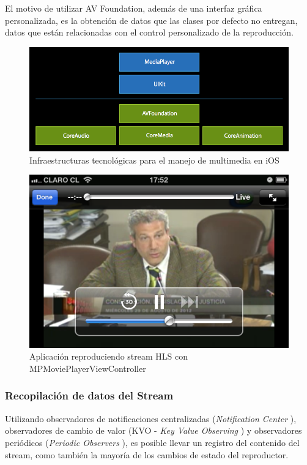 El motivo de utilizar AV Foundation, además de una interfaz gráfica personalizada, es la obtención de datos que las clases por defecto no entregan, datos que están relacionadas con el control personalizado de la reproducción.


\begin{figure}[H]
	\centering
	\includegraphics[scale=0.5]{imgs/ios-tech-frameworks.png}
	\caption{Infraestructuras tecnológicas para el manejo de multimedia en iOS}
	\label{IMG-ios-tech-frameworks}	
\end{figure}

\begin{figure}[H]
	\centering
	\includegraphics[scale=0.3]{imgs/mpmpvc-example.png}
	\caption{Aplicación reproduciendo stream HLS con MPMoviePlayerViewController}
	\label{IMG-mpmpvc-example}	
\end{figure}

		\subsubsection{Recopilación de datos del Stream}
Utilizando observadores de notificaciones centralizadas (\textit{Notification Center} \cite{bib:ios-nsnotificationcenter}), observadores de cambio de valor (KVO - \textit{Key Value Observing} \cite{bib:kvo-guide}) y observadores periódicos (\textit{Periodic Observers} \cite{bib:avplayer-periodic}), es posible llevar un registro del contenido del stream, como también la mayoría de los cambios de estado del reproductor.\\

